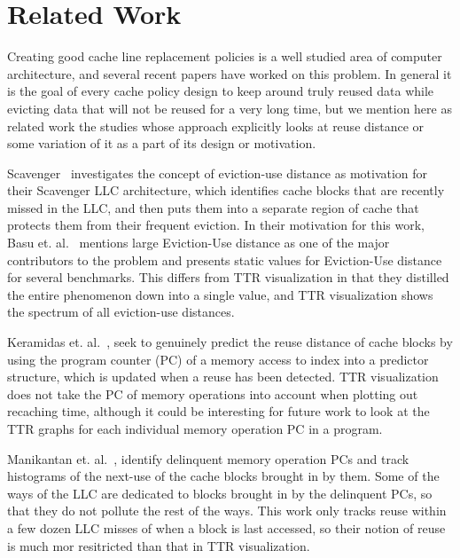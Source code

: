 \section{Related Work}

Creating good cache line replacement policies is a well
studied area of computer architecture, and several recent papers have
worked on this problem.  In general it is the goal of every cache
policy design to keep around truly reused data while evicting data
that will not be reused for a very long time, but we mention here as
related work the
studies whose approach explicitly looks at reuse distance or some
variation of it as a part of its design or motivation.

Scavenger~\cite{basukirman07} investigates the concept of eviction-use distance
as motivation for their Scavenger LLC architecture, which identifies
cache blocks that are recently missed in the LLC, and then puts them
into a separate region of cache that protects them from their frequent
eviction.  In their motivation for this work, Basu et. al.~\cite{basukirman07}
mentions large Eviction-Use distance as one of the major contributors
to the problem and presents static values for Eviction-Use distance
for several benchmarks.  This differs from TTR visualization in that
they distilled the entire phenomenon down into a single value, and
TTR visualization shows the spectrum of all eviction-use distances.

Keramidas et. al.~\cite{keramidaspetoumenos07}, seek to genuinely predict the reuse
distance of cache blocks by using the program counter (PC) of a memory
access to index into a predictor structure, which is updated when a
reuse has been detected.  TTR visualization does not take the PC of
memory operations into account when plotting out recaching time,
although it could be interesting for future work to look at the TTR
graphs for each individual memory operation PC in a program.

Manikantan et. al.~\cite{manikantanrajan10,manikantanrajan11}, identify delinquent memory operation PCs and track
histograms of the next-use of the cache blocks brought in by them.
Some of the ways of the LLC are dedicated to blocks brought in by the
delinquent PCs, so that they do not pollute the rest of the ways.
This work only tracks reuse within a few dozen LLC misses of when a
block is last accessed, so their notion of reuse is much mor
resitricted than that in TTR visualization.

